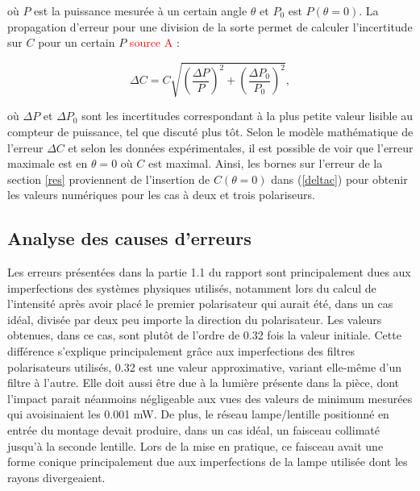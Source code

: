 \documentclass[11pt,letterpaper]{article}
\begin{document}
où $P$ est la puissance mesurée à un certain angle $\theta$ et $P_{0}$ est $P\left( \theta= 0 \right)$.
La propagation d'erreur pour une division de la sorte permet de calculer l'incertitude sur $C$ pour un
certain $P$ \textcolor{red}{source A} :

\begin{equation}\label{deltac}
  \Delta C = C\sqrt{\left( \frac{\Delta P}{P} \right)^{2} + \left( \frac{\Delta P_{0}}{P_{0}} \right)^{2}},
\end{equation}

où $\Delta P$ et $\Delta P_{0}$ sont les incertitudes correspondant à la plus petite valeur lisible au
compteur de puissance, tel que discuté plus tôt. Selon le modèle mathématique de 
l'erreur $\Delta C$ et selon les données expérimentales, il est possible de voir que l'erreur maximale 
est en $\theta= 0$ où $C$ est maximal. Ainsi, les bornes sur l'erreur de la section \ref{res} proviennent
de l'insertion de $C\left( \theta= 0 \right)$ dans (\ref{deltac}) pour obtenir les valeurs numériques pour
les cas à deux et trois polariseurs.



\subsection{Analyse des causes d'erreurs}

 Les erreurs présentées dans la partie 1.1 du rapport sont principalement dues aux imperfections des systèmes physiques utilisés, notamment lors du calcul de l'intensité après avoir placé le premier polarisateur qui aurait été, dans un cas idéal, divisée par deux peu importe la direction du polarisateur. Les valeurs obtenues, dans ce cas, sont plutôt de l'ordre de 0.32 fois la valeur initiale. Cette différence s'explique principalement grâce aux imperfections des filtres polarisateurs utilisés, 0.32 est une valeur approximative, variant elle-même d'un filtre à l'autre. Elle doit aussi être due à la lumière présente dans la pièce, dont l'impact parait néanmoins négligeable aux vues des valeurs de minimum mesurées qui avoisinaient les 0.001 mW. De plus, le réseau lampe/lentille positionné en entrée du montage devait produire, dans un cas idéal, un faisceau collimaté jusqu'à la seconde lentille. Lors de la mise en pratique, ce faisceau avait une forme conique principalement due aux imperfections de la lampe utilisée dont les rayons divergeaient.
\end{document}
